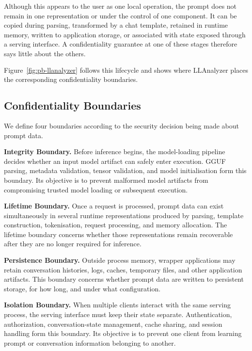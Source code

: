 \documentclass[journal,tifs]{IEEEtran}
\begin{document}
Although this appears to the user as one local operation, the prompt does
not remain in one representation or under the control of one component.
It can be copied during parsing, transformed by a chat template, retained
in runtime memory, written to application storage, or associated with
state exposed through a serving interface. A confidentiality guarantee
at one of these stages therefore says little about the others.

Figure~\ref{fig:pb-llanalyzer} follows this lifecycle and shows where
LLAnalyzer places the corresponding confidentiality boundaries.

\subsection{Confidentiality Boundaries}

We define four boundaries according to the security decision being made
about prompt data.

\noindent\textbf{Integrity Boundary.}
Before inference begins, the model-loading pipeline decides whether an
input model artifact can safely enter execution. GGUF parsing, metadata
validation, tensor validation, and model initialisation form this
boundary. Its objective is to prevent malformed model artifacts from
compromising trusted model loading or subsequent execution.

\noindent\textbf{Lifetime Boundary.}
Once a request is processed, prompt data can exist simultaneously in
several runtime representations produced by parsing, template
construction, tokenisation, request processing, and memory allocation.
The lifetime boundary concerns whether those representations remain
recoverable after they are no longer required for inference.

\noindent\textbf{Persistence Boundary.}
Outside process memory, wrapper applications may retain conversation
histories, logs, caches, temporary files, and other application
artifacts. This boundary concerns whether prompt data are written to
persistent storage, for how long, and under what configuration.

\noindent\textbf{Isolation Boundary.}
When multiple clients interact with the same serving process, the
serving interface must keep their state separate. Authentication,
authorization, conversation-state management, cache sharing, and session
handling form this boundary. Its objective is to prevent one client from
learning prompt or conversation information belonging to another.
\end{document}
